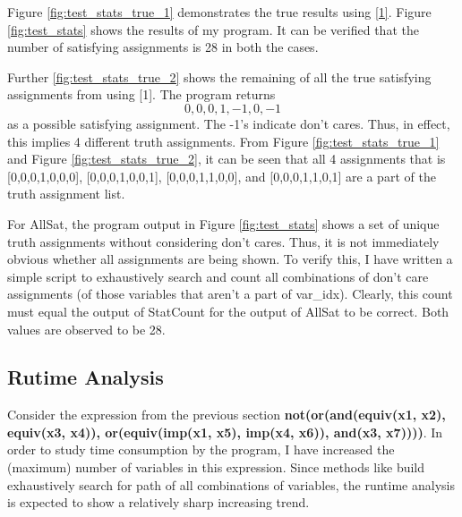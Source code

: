 \documentclass[a4paper, titlepage, 12pt]{article}
\numberwithin{equation}{section}
\begin{document}
\begin{itemize}
                    Figure \ref{fig:test_stats_true_1} demonstrates the true results using \href{http://formal.cs.utah.edu:8080/pbl/BDD.php}{[1]}.
                    Figure \ref{fig:test_stats} shows the results of my program.
                    It can be verified that the number of satisfying assignments is 28 in both the cases.

                    Further \ref{fig:test_stats_true_2} shows the remaining of all the true satisfying assignments from using [1].
                    The program returns \[0,0,0,1,-1,0,-1\] as a possible satisfying assignment.
                    The -1's indicate don't cares.
                    Thus, in effect, this implies 4 different truth assignments.
                    From Figure \ref{fig:test_stats_true_1} and Figure \ref{fig:test_stats_true_2}, it can be seen that all 4 assignments that is [0,0,0,1,0,0,0], [0,0,0,1,0,0,1], [0,0,0,1,1,0,0], and [0,0,0,1,1,0,1] are a part of the truth assignment list.

                    For AllSat, the program output in Figure \ref{fig:test_stats} shows a set of unique truth assignments without considering don't cares.
                    Thus, it is not immediately obvious whether all assignments are being shown.
                    To verify this, I have written a simple script to exhaustively search and count all combinations of don't care assignments (of those variables that aren't a part of var\_idx).
                    Clearly, this count must equal the output of StatCount for the output of AllSat to be correct.
                    Both values are observed to be 28.


            \end{itemize}

        \subsection{Rutime Analysis}
            
            Consider the expression from the previous section \textbf{not(or(and(equiv(x1, x2), equiv(x3, x4)), or(equiv(imp(x1, x5), imp(x4, x6)), and(x3, x7))))}.
            In order to study time consumption by the program, I have increased the (maximum) number of variables in this expression.
            Since methods like build exhaustively search for path of all combinations of variables, the runtime analysis is expected to show a relatively sharp increasing trend.
\end{document}
